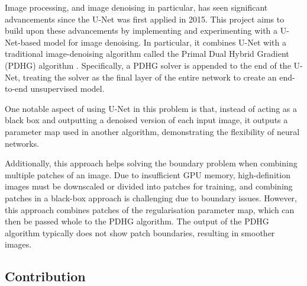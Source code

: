 \documentclass[12pt]{article}
\begin{document}
Image processing, and image denoising in particular, has seen significant advancements since the U-Net was first applied in 2015. This project aims to build upon these advancements by implementing and experimenting with a U-Net-based model for image denoising.
In particular, it combines U-Net with a traditional image-denoising algorithm called the Primal Dual Hybrid Gradient (PDHG) algorithm \cite{kofler2023learning}.
Specifically, a PDHG solver is appended to the end of the U-Net, treating the solver as the final layer of the entire network to create an end-to-end unsupervised model.


One notable aspect of using U-Net in this problem is that, instead of acting as a black box and outputting a denoised version of each input image, it outputs a parameter map used in another algorithm, demonstrating the flexibility of neural networks.

Additionally, this approach helps solving the boundary problem when combining multiple patches of an image. Due to insufficient GPU memory, high-definition images must be downscaled or divided into patches for training, and combining patches in a black-box approach is challenging due to boundary issues. However, this approach combines patches of the regularisation parameter map, which can then be passed whole to the PDHG algorithm. The output of the PDHG algorithm typically does not show patch boundaries, resulting in smoother images.



\subsection{Contribution}
\end{document}
